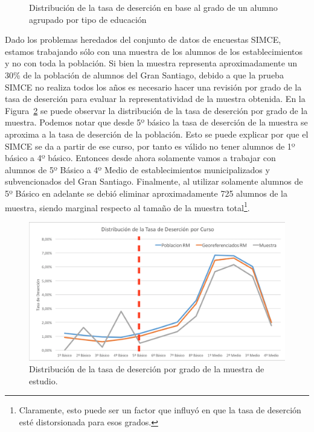 \begin{figure}
  \centering
      \caption{Distribución de la tasa de deserción en base al grado de un alumno agrupado por tipo de educación}
    \label{fig:tdg}
\end{figure}
Dado los problemas heredados del conjunto de datos de encuestas SIMCE, estamos trabajando sólo con una muestra de los alumnos de los establecimientos y no con toda la población. Si bien la muestra representa aproximadamente un 30\% de la población de alumnos del Gran Santiago, debido a que la prueba SIMCE no realiza todos los años es necesario hacer una revisión por grado de la tasa de deserción para evaluar la representatividad de la muestra obtenida. En la Figura~\ref{fig:deserciongradomuestra} se puede observar la distribución de la tasa de deserción por grado de la muestra. Podemos notar que desde 5º básico la tasa de deserción de la muestra se aproxima a la tasa de deserción de la población. Esto se puede explicar por que el SIMCE se da a partir de ese curso, por tanto es válido no tener alumnos de 1º básico a 4º básico. Entonces desde ahora solamente vamos a trabajar con alumnos de 5º Básico a 4º Medio de establecimientos municipalizados y subvencionados del Gran Santiago.
Finalmente, al utilizar solamente alumnos de 5º Básico en adelante se debió eliminar aproximadamente 725 alumnos de la muestra, siendo marginal respecto al tamaño de la muestra total\footnote{Claramente, esto puede ser un factor que influyó en que la tasa de deserción esté distorsionada para esos grados.}.
\begin{figure}[H]
  \centering
    \includegraphics[trim=0cm 0cm 0cm 0cm,scale=0.5]{Figuras/6SolucionPropuesta/testdist1.png}
      \caption{Distribución de la tasa de deserción por grado de la muestra de estudio.}
    \label{fig:deserciongradomuestra}
\end{figure}

